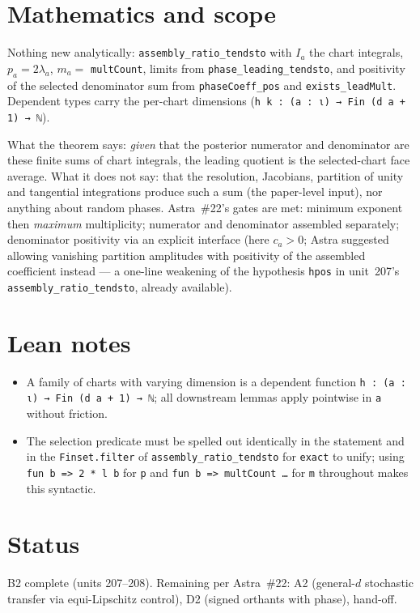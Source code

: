 \documentclass[11pt]{article}
\begin{document}
\section{Mathematics and scope}
Nothing new analytically: \texttt{assembly\_ratio\_tendsto} with $I_a$ the chart integrals,
$p_a=2\lambda_a$, $m_a=$ \texttt{multCount}, limits from \texttt{phase\_leading\_tendsto}, and
positivity of the selected denominator sum from \texttt{phaseCoeff\_pos} and
\texttt{exists\_leadMult}. Dependent types carry the per-chart dimensions
(\texttt{h k : (a : ι) → Fin (d a + 1) → ℕ}).

What the theorem says: \emph{given} that the posterior numerator and denominator are these finite
sums of chart integrals, the leading quotient is the selected-chart face average. What it does not
say: that the resolution, Jacobians, partition of unity and tangential integrations produce such a
sum (the paper-level input), nor anything about random phases. Astra~\#22's gates are met:
minimum exponent then \emph{maximum} multiplicity; numerator and denominator assembled separately;
denominator positivity via an explicit interface (here $c_a>0$; Astra suggested allowing vanishing
partition amplitudes with positivity of the assembled coefficient instead --- a one-line weakening
of the hypothesis \texttt{hpos} in unit~207's \texttt{assembly\_ratio\_tendsto}, already available).

\section{Lean notes}
\begin{itemize}
\item A family of charts with varying dimension is a dependent function
  \texttt{h : (a : ι) → Fin (d a + 1) → ℕ}; all downstream lemmas apply pointwise in \texttt{a}
  without friction.
\item The selection predicate must be spelled out identically in the statement and in the
  \texttt{Finset.filter} of \texttt{assembly\_ratio\_tendsto} for \texttt{exact} to unify; using
  \texttt{fun b => 2 * l b} for \texttt{p} and \texttt{fun b => multCount …} for \texttt{m}
  throughout makes this syntactic.
\end{itemize}

\section{Status}
B2 complete (units 207--208). Remaining per Astra~\#22: A2 (general-$d$ stochastic transfer via
equi-Lipschitz control), D2 (signed orthants with phase), hand-off.
\end{document}
